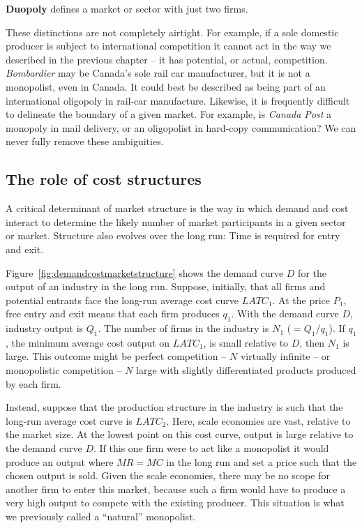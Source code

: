 \begin{DefBox}
	\textbf{Duopoly} defines a market or sector with just two firms.
\end{DefBox}

These distinctions are not completely airtight. For example, if a sole
domestic producer is subject to international competition it cannot act in
the way we described in the previous chapter -- it has potential, or actual,
competition. \textit{Bombardier} may be Canada's sole rail car manufacturer,
but it is not a monopolist, even in Canada. It could best be described as
being part of an international oligopoly in rail-car manufacture. Likewise, it
is frequently difficult to delineate the boundary of a given market. For
example, is \textit{Canada Post} a monopoly in mail delivery, or an
oligopolist in hard-copy communication? We can never fully remove these
ambiguities.

\newhtmlpage

\subsection*{The role of cost structures}

A critical determinant of market structure is the way in which demand and
cost interact to determine the likely number of market participants in a
given sector or market. Structure also evolves over the long run: Time is
required for entry and exit.

Figure~\ref{fig:demandcostmarketstructure} shows the demand curve $D$ for
the output of an industry in the long run. Suppose, initially, that all
firms and potential entrants face the long-run average cost curve $LATC_1$.
At the price $P_1$, free entry and exit means that each firm produces $q_1$.
With the demand curve $D$, industry output is $Q_1$. The number of firms in
the industry is $N_1$ ($=Q_1/q_1$). If $q_1$, the minimum average cost
output on $LATC_1$, is small relative to $D$, then $N_1$ is large. This
outcome might be perfect competition -- $N$ virtually infinite -- or
monopolistic competition -- $N$ large with slightly differentiated products
produced by each firm.



\newhtmlpage

Instead, suppose that the production structure in the industry is such that
the long-run average cost curve is $LATC_2$. Here, scale economies are vast,
relative to the market size. At the lowest point on this cost curve, output
is large relative to the demand curve $D$. If this one firm were to act like
a monopolist it would produce an output where $MR=MC$ in the long run and
set a price such that the chosen output is sold. Given the scale economies,
there may be no scope for another firm to enter this market, because such a
firm would have to produce a very high output to compete with the existing
producer. This situation is what we previously called a ``natural''
monopolist.

